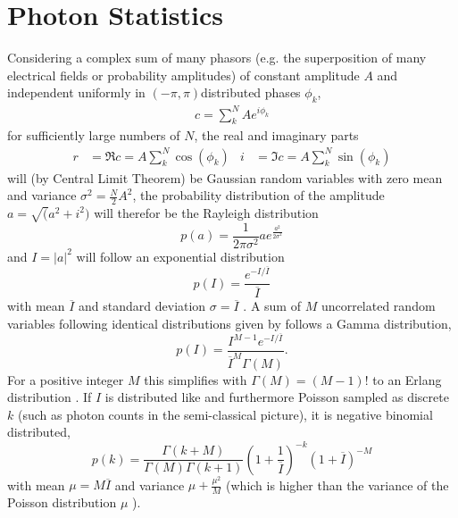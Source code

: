\section{Photon Statistics}
Considering a complex sum of many phasors (e.g. the superposition of many electrical fields or probability amplitudes) of constant amplitude $A$ and independent uniformly in $(-\pi,\pi)$distributed phases $\phi_k$,
\begin{align}
	c=\sum^N_k A e^{i\phi_k}
\end{align}
for sufficiently large numbers of $N$, the real and imaginary parts
\begin{align*}
	r&=\Re c =  A \sum^N_k \cos(\phi_k) &
	i&= \Im c =A \sum^N_k \sin(\phi_k)
\end{align*}
will (by Central Limit Theorem) be Gaussian random variables with zero mean and variance $\sigma^2=\frac{N}{2}A^2$, the probability distribution of the amplitude $a=\sqrt(a^2+i^2)$ will therefor be the Rayleigh distribution
\begin{equation}
	p(a)=\frac{1}{2\pi\sigma^2} a e^{\frac{a^2}{2\sigma^2}}
\end{equation}
and  $I=\left|a\right|^2$ will  follow an exponential distribution
\begin{equation}
	\label{eq:expdistr}
	p(I)=\frac{ e^{-I/\overline{I}}}{\overline{I}}
\end{equation} 
with mean $\overline{I}$ and standard deviation $\sigma=\overline{I}$  \cite{goodman2000,goodman1976}.
A sum of $M$ uncorrelated random variables following identical distributions given by  follows a Gamma distribution,
\begin{equation}
	\label{eq:gammadistr}
	p(I)=\frac{I^{M-1} e^{-I/\overline{I}}} {\overline{I}^M \Gamma(M)}.
\end{equation}
For a positive integer $M$ this simplifies with $\Gamma(M)=(M-1)!$ to an Erlang distribution  \cite{forbes2010,trost2020}.
If $I$ is distributed like  and furthermore Poisson sampled as discrete $k$ (such as photon counts in the semi-classical picture), it is negative binomial distributed,
\cite{trost2020,mandel1959,holmes2019}
\begin{equation}
	p(k)=
	\frac{\Gamma(k+M)}{\Gamma(M)\Gamma(k+1) }
	\left( 1+\frac{1}{\overline{I}}
	\right)^{-k}
	\left( 1+\overline{I}
	\right)^{-M}
	\label{eq:negbinomialdist}
\end{equation}
with mean $\mu=M\overline{I}$ and variance $\mu+\frac{\mu^2}{M}$ (which is higher than the variance of the Poisson distribution $\mu$ ).

